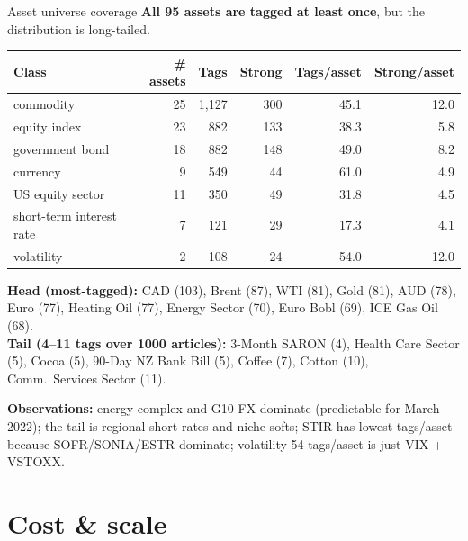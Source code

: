 \documentclass[10pt,aspectratio=169]{beamer}
\begin{document}
\begin{frame}{Asset universe coverage}
  \scriptsize
  \textbf{All 95 assets are tagged at least once}, but the distribution is long-tailed.

  \vspace{0.4em}
  \centering
  \setlength{\tabcolsep}{6pt}
  \renewcommand{\arraystretch}{1.1}
  \begin{tabular}{lrrrrr}
    \toprule
    \textbf{Class} & \textbf{\# assets} & \textbf{Tags} & \textbf{Strong} & \textbf{Tags/asset} & \textbf{Strong/asset} \\
    \midrule
    commodity                & 25 & 1{,}127 & 300 & 45.1 & 12.0 \\
    equity index             & 23 &   882 & 133 & 38.3 & 5.8 \\
    government bond          & 18 &   882 & 148 & 49.0 & 8.2 \\
    currency                 &  9 &   549 &  44 & 61.0 & 4.9 \\
    US equity sector         & 11 &   350 &  49 & 31.8 & 4.5 \\
    short-term interest rate &  7 &   121 &  29 & 17.3 & 4.1 \\
    volatility               &  2 &   108 &  24 & 54.0 & 12.0 \\
    \bottomrule
  \end{tabular}

  \vspace{0.4em}
  \raggedright
  \textbf{Head (most-tagged):} CAD (103), Brent (87), WTI (81), Gold (81), AUD (78), Euro (77),
  Heating Oil (77), Energy Sector (70), Euro Bobl (69), ICE Gas Oil (68). \\[0.2em]
  \textbf{Tail (4--11 tags over 1000 articles):} 3-Month SARON (4), Health Care Sector (5),
  Cocoa (5), 90-Day NZ Bank Bill (5), Coffee (7), Cotton (10), Comm.\ Services Sector (11).

  \vspace{0.3em}
  \textbf{Observations:} energy complex and G10 FX dominate (predictable for March 2022); the
  tail is regional short rates and niche softs; STIR has lowest tags/asset because
  SOFR/SONIA/ESTR dominate; volatility 54 tags/asset is just VIX + VSTOXX.
\end{frame}

\section{Cost \& scale}
\end{document}
